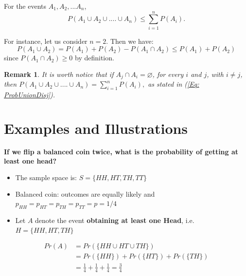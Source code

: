 \documentclass[notes=show,handout]{beamer}\usepackage[]{graphicx}\usepackage[]{color}
\newtheorem{remark}{Remark}[section]
\begin{document}
\begin{frame}{\secname}
  \begin{theorem} 
  For the events $A_1,A_2,... A_n$,
  $$
  P(A_1 \cup A_2 \cup....\cup A_n) \leq \sum_{i=1}^{n}P(A_i).
  $$
  \end{theorem}
  \vspace{0.1cm}
  For instance, let us consider $n=2$. Then we have:
  $$
  P(A_1 \cup A_2 ) = P(A_1) + P(A_2) - P(A_1 \cap A_2) \leq P(A_1) + P(A_2)
  $$
  since $P(A_1 \cap A_2) \geq 0$ by definition.
  \begin{remark}
  It is worth notice that if $A_j \cap A_i = \varnothing$, for every $i$ and $j$, with $i\neq j$, then
  $
  P(A_1 \cup A_2 \cup....\cup A_n) = \sum_{i=1}^{n}P(A_i),
  $
  as stated in (\ref{Eq: ProbUnionDisj}).
  \end{remark}
\end{frame}

\section{Examples and Illustrations}

\begin{frame}{\secname}
  \begin{example}
    \begin{footnotesize}
    \textbf{If we flip a balanced coin twice, {what is the probability of getting at least one head?}}

    \begin{itemize}
    \item The sample space is: $S = \{HH, HT, TH, TT\}$
    \item Balanced coin: outcomes are equally likely and $p_{HH} = p_{HT} = p_{TH} = p_{TT} = p = 1/4$
    \item Let $A$ denote the event \textbf{obtaining at least one Head}, i.e. $H = \{HH, HT, TH\}$
    \end{itemize}
    \begin{align*}
    Pr(A) &= Pr(\{HH \cup HT \cup TH\}) \\
          &= Pr(\{HH\}) +   Pr(\{HT\}) + Pr(\{TH\})\\
          &= \frac{1}{4} +\frac{1}{4}+\frac{1}{4} = \frac{3}{4}
    \end{align*}
    \end{footnotesize}
  \end{example}
\end{frame}
\end{document}
